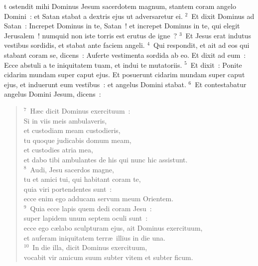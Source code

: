 \bchapter
{}t ostendit mihi Dominus Jesum sacerdotem magnum, stantem coram angelo Domini~: et Satan stabat a dextris ejus ut adversaretur ei.
${}^{2}$~Et dixit Dominus ad Satan~: Increpet Dominus in te, Satan~! et increpet Dominus in te, qui elegit Jerusalem~! numquid non iste torris est erutus de igne~?
${}^{3}$~Et Jesus erat indutus vestibus sordidis, et stabat ante faciem angeli.
${}^{4}$~Qui respondit, et ait ad eos qui stabant coram se, dicens~: Auferte vestimenta sordida ab eo. Et dixit ad eum~: Ecce abstuli a te iniquitatem tuam, et indui te mutatoriis.
${}^{5}$~Et dixit~: Ponite cidarim mundam super caput ejus. Et posuerunt cidarim mundam super caput ejus, et induerunt eum vestibus~: et angelus Domini stabat.
${}^{6}$~Et contestabatur angelus Domini Jesum, dicens~:
\begin{flushleft}\begin{verse}${}^{7}$~H\ae c dicit Dominus exercituum~:\\ Si in viis meis ambulaveris,\\ et custodiam meam custodieris,\\ tu quoque judicabis domum meam,\\ et custodies atria mea,\\ et dabo tibi ambulantes de his qui nunc hic assistunt.\\
${}^{8}$~Audi, Jesu sacerdos magne,\\ tu et amici tui, qui habitant coram te,\\ quia viri portendentes sunt~:\\ ecce enim ego adducam servum meum Orientem.\\
${}^{9}$~Quia ecce lapis quem dedi coram Jesu~:\\ super lapidem unum septem oculi sunt~:\\ ecce ego c\ae labo sculpturam ejus, ait Dominus exercituum,\\ et auferam iniquitatem terr\ae\ illius in die una.\\
${}^{10}$~In die illa, dicit Dominus exercituum,\\ vocabit vir amicum suum subter vitem et subter ficum.\end{verse}\end{flushleft}



